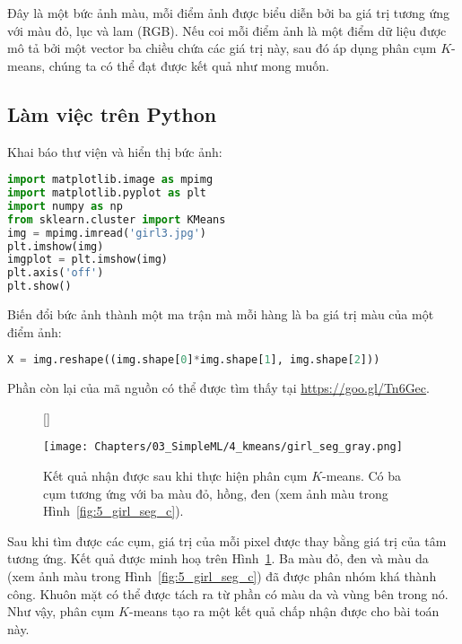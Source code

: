 Đây là một bức ảnh màu, mỗi điểm ảnh được biểu diễn bởi ba giá trị tương ứng với
màu đỏ, lục và lam (RGB). Nếu coi mỗi điểm ảnh là một điểm dữ liệu được mô tả
bởi một vector ba chiều chứa các giá trị này, sau đó áp dụng phân cụm $K$-means,
chúng ta có thể đạt được kết quả như mong muốn.



\subsection{Làm việc trên Python}

{Khai báo thư viện và hiển thị bức ảnh:}

\begin{lstlisting}[language=Python]
import matplotlib.image as mpimg
import matplotlib.pyplot as plt
import numpy as np
from sklearn.cluster import KMeans
img = mpimg.imread('girl3.jpg')
plt.imshow(img)
imgplot = plt.imshow(img)
plt.axis('off')
plt.show()
\end{lstlisting}


{Biến đổi bức ảnh thành một ma trận mà mỗi hàng là ba giá trị màu của một điểm ảnh:}
\begin{lstlisting}[language=Python]
X = img.reshape((img.shape[0]*img.shape[1], img.shape[2]))
\end{lstlisting}

Phần còn lại của mã nguồn có thể được tìm thấy tại \url{https://goo.gl/Tn6Gec}.



\begin{figure}[t]
[\FBwidth]
{\caption{
Kết quả nhận được sau khi thực hiện phân cụm $K$-means.
Có ba cụm tương ứng với ba màu đỏ, hồng, đen (xem ảnh màu trong Hình~\ref{fig:5_girl_seg_c}).
}
\label{fig:5_girl_seg}}
{ %
\texttt{[image: Chapters/03\_SimpleML/4\_kmeans/girl\_seg\_gray.png]}
}
\end{figure}

Sau khi tìm được các cụm, giá trị của mỗi pixel được thay bằng giá trị của
tâm tương ứng. Kết quả được minh hoạ trên Hình~\ref{fig:5_girl_seg}. Ba màu
đỏ, đen và màu da (xem ảnh màu trong Hình~\ref{fig:5_girl_seg_c}) đã được phân
nhóm khá thành công. Khuôn mặt có thể được tách ra từ phần có màu da và vùng
bên trong nó. Như vậy, phân cụm $K$-means tạo ra một kết quả chấp nhận được
cho bài toán này.


